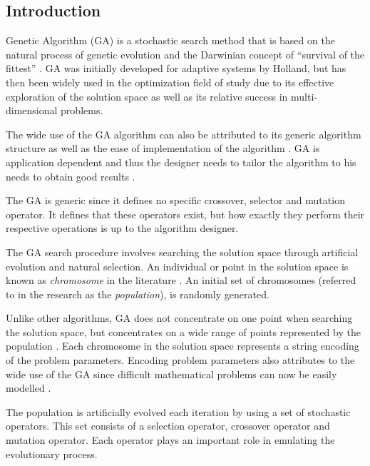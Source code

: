 \subsection{Introduction}
Genetic Algorithm (GA) is a stochastic search method that is based on the natural process of genetic evolution and the Darwinian concept of ``survival of the fittest'' \cite{DistributedHierarchicalGA,AcceleratingGA,AdaptiveSAGA,FamilyGA}. GA was initially developed for adaptive systems by Holland, but has then been widely used in the optimization field of study due to its effective exploration of the solution space as well as its relative success in multi-dimensional problems\cite{ParallelGASA,DistributedHierarchicalGA,FamilyGA}. 

The wide use of the GA algorithm can also be attributed to its generic algorithm structure as well as the ease of implementation of the algorithm \cite{FamilyGA,AdaptiveSAGA}. GA is application dependent and thus the designer needs to tailor the algorithm to his needs to obtain good results \cite{AcceleratingGA}.

The GA is generic since it defines no specific crossover, selector and mutation operator. It defines that these operators exist, but how exactly they perform their respective operations is up to the algorithm designer.

The GA search procedure involves searching the solution space through artificial evolution and natural selection\cite{FamilyGA,MultiPopGA,HybridIntelliGA}. An individual or point in the solution space is known as \emph{chromosome} in the literature \cite{HumanPassiveGA}. An initial set of chromosomes (referred to in the research as the \emph{population}), is randomly generated\cite{FamilyGA,HybridIntelliGA,AcceleratingGA,MultiPopGA}. 

Unlike other algorithms, GA does not concentrate on one point when searching the solution space, but concentrates on a wide range of points represented by the population \cite{DistributedHierarchicalGA,FamilyGA,HybridIntelliGA}\label{GASearchPoints}. Each chromosome in the solution space represents a string encoding of the problem parameters\cite{FamilyGA}. Encoding problem parameters also attributes to the wide use of the GA since difficult mathematical problems can now be easily modelled \cite{AcceleratingGA}.

The population is artificially evolved each iteration by using a set of stochastic operators\cite{SelfAdaptiveGA}. This set consists of a selection operator, crossover operator and mutation operator\cite{SelfAdaptiveGA,MultiPopGA}. Each operator plays an important role in emulating the evolutionary process. 

